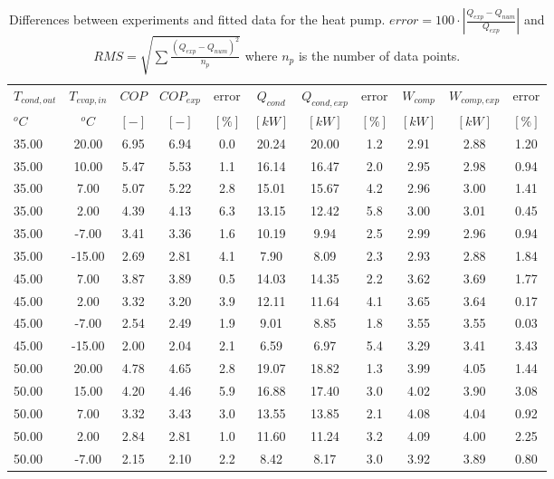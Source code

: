 \documentclass[english]{SPFShortReport}
\begin{document}
\begin{table}[!ht]
\begin{small}
\caption{Differences between experiments and fitted data for the heat pump.          $error=100 \cdot |\frac{Q_{exp}-Q_{num}}{Q_{exp}}|$ and $RMS = \sqrt { \sum{\frac{(Q_{exp}-Q_{num})^2}{n_p}} }$ where $n_p$ is the number of data points.}
\begin{center}
\resizebox{12cm}{!} 
{
\begin{tabular}{l | c c c c c c c c c c } 
\hline
\hline
$T_{cond,out}$ &$T_{evap,in}$ &$COP$ &$COP_{exp}$ &error &$Q_{cond}$ &$Q_{cond,exp}$ &error &$W_{comp}$ &$W_{comp,exp}$ &error \\ 
$^oC$ &$^oC$ &$[-]$ &$[-]$ &$[\%]$ &$[kW]$ &$[kW]$ &$[\%]$ &$[kW]$ &$[kW]$ &$[\%]$\\ 
\hline
35.00  & 20.00 & 6.95 & 6.94 & 0.0 & 20.24 & 20.00 & 1.2 & 2.91 & 2.88 & 1.20\\ 
35.00  & 10.00 & 5.47 & 5.53 & 1.1 & 16.14 & 16.47 & 2.0 & 2.95 & 2.98 & 0.94\\ 
35.00  & 7.00 & 5.07 & 5.22 & 2.8 & 15.01 & 15.67 & 4.2 & 2.96 & 3.00 & 1.41\\ 
35.00  & 2.00 & 4.39 & 4.13 & 6.3 & 13.15 & 12.42 & 5.8 & 3.00 & 3.01 & 0.45\\ 
35.00  & -7.00 & 3.41 & 3.36 & 1.6 & 10.19 & 9.94 & 2.5 & 2.99 & 2.96 & 0.94\\ 
35.00  & -15.00 & 2.69 & 2.81 & 4.1 & 7.90 & 8.09 & 2.3 & 2.93 & 2.88 & 1.84\\ 
45.00  & 7.00 & 3.87 & 3.89 & 0.5 & 14.03 & 14.35 & 2.2 & 3.62 & 3.69 & 1.77\\ 
45.00  & 2.00 & 3.32 & 3.20 & 3.9 & 12.11 & 11.64 & 4.1 & 3.65 & 3.64 & 0.17\\ 
45.00  & -7.00 & 2.54 & 2.49 & 1.9 & 9.01 & 8.85 & 1.8 & 3.55 & 3.55 & 0.03\\ 
45.00  & -15.00 & 2.00 & 2.04 & 2.1 & 6.59 & 6.97 & 5.4 & 3.29 & 3.41 & 3.43\\ 
50.00  & 20.00 & 4.78 & 4.65 & 2.8 & 19.07 & 18.82 & 1.3 & 3.99 & 4.05 & 1.44\\ 
50.00  & 15.00 & 4.20 & 4.46 & 5.9 & 16.88 & 17.40 & 3.0 & 4.02 & 3.90 & 3.08\\ 
50.00  & 7.00 & 3.32 & 3.43 & 3.0 & 13.55 & 13.85 & 2.1 & 4.08 & 4.04 & 0.92\\ 
50.00  & 2.00 & 2.84 & 2.81 & 1.0 & 11.60 & 11.24 & 3.2 & 4.09 & 4.00 & 2.25\\ 
50.00  & -7.00 & 2.15 & 2.10 & 2.2 & 8.42 & 8.17 & 3.0 & 3.92 & 3.89 & 0.80\\ 

\end{tabular}}
\end{center}
\end{small}
\end{table}
\end{document}
